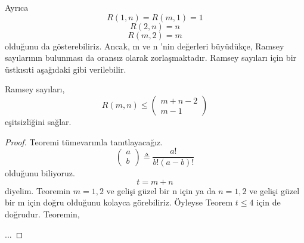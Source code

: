\documentclass[11pt]{amsbook}
\begin{document}

\setcounter{page}{39}
\setcounter{section}{1}
\setcounter{subsection}{6}

Ayrıca
\begin{equation*}
	R(1,n) = R(m,1) = 1 
\end{equation*}
\begin{equation*}
	R(2,n) = n 
\end{equation*}
\begin{equation*}
	R(m,2) = m 
\end{equation*}
olduğunu da gösterebiliriz. Ancak, m ve n 'nin değerleri büyüdükçe,
Ramsey sayılarının bulunması da oransız olarak zorlaşmaktadır.
Ramsey sayıları için bir üstkısıti aşağıdaki gibi verilebilir.

\begin{theorem}
	Ramsey sayıları,
	\begin{equation*}
		R(m,n) \leq 
		\begin{pmatrix}
			m + n - 2 \\
			m-1
		\end{pmatrix}
	\end{equation*}
	eşitsizliğini sağlar.
\end{theorem}
\begin{proof}
	Teoremi tümevarımla tanıtlayacağız.
	\begin{equation*} 
		\begin{pmatrix}
			a \\
			b
		\end{pmatrix}
		\triangleq
		\frac{a!}{b!(a-b)!}
	\end{equation*}
	olduğunu biliyoruz.
	\begin{equation*} 
		t = m + n
	\end{equation*}
	diyelim. Teoremin $m = 1,2$ ve gelişi güzel bir n için ya da
	$n=1,2$ ve gelişi güzel bir m için doğru olduğunu kolayca 
	görebiliriz. Öyleyse Teorem $t\leq4$ için de doğrudur. Teoremin,
	
	
	...
\end{proof}
\end{document}
